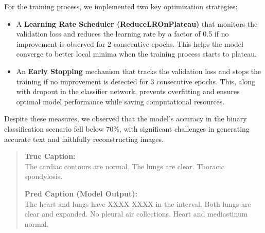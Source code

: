 \documentclass[a4paper,12pt]{article}
\begin{document}
For the training process, we implemented two key optimization strategies:

\begin{itemize}
    \item A \textbf{Learning Rate Scheduler (ReduceLROnPlateau)} that monitors the validation loss and reduces the learning rate by a factor of 0.5 if no improvement is observed for 2 consecutive epochs. 
    This helps the model converge to better local minima when the training process starts to plateau.
    
    \item An \textbf{Early Stopping} mechanism that tracks the validation loss and stops the training if no improvement is detected for 3 consecutive epochs. 
    This, along with dropout in the classifier network, prevents overfitting and ensures optimal model performance while saving computational resources.
\end{itemize}


Despite these measures, we observed that the model's accuracy in the binary classification scenario fell below 70\%, with significant challenges in generating accurate text and faithfully reconstructing images.\\

\begin{quote}
    \textbf{True Caption:}\\
    The cardiac contours are normal. The lungs are clear. Thoracic spondylosis.
    
    \medskip
    
    \textbf{Pred Caption (Model Output):}\\
    The heart and lungs have XXXX XXXX in the interval. Both lungs are clear and expanded. 
    No pleural air collections. Heart and mediastinum normal.
\end{quote}
    
\end{document}
